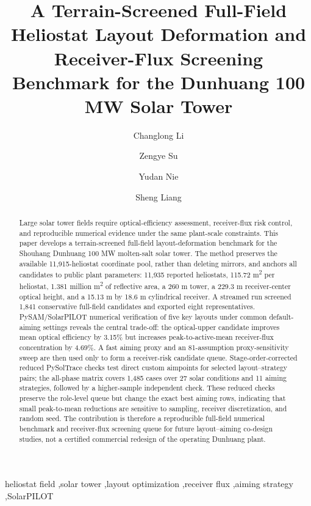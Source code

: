 \documentclass[final,3p,times]{elsarticle}
\begin{document}
\begin{frontmatter}

\title{A Terrain-Screened Full-Field Heliostat Layout Deformation and Receiver-Flux Screening Benchmark for the Dunhuang 100 MW Solar Tower}

\author[aff1]{Changlong Li}
\author[aff1]{Zengye Su}
\author[aff1]{Yudan Nie}
\author[aff1]{Sheng Liang}
\address[aff1]{Guangzhou College of Commerce, Guangzhou, China}

\begin{abstract}
Large solar tower fields require optical-efficiency assessment, receiver-flux risk control, and reproducible numerical evidence under the same plant-scale constraints. This paper develops a terrain-screened full-field layout-deformation benchmark for the Shouhang Dunhuang 100 MW molten-salt solar tower. The method preserves the available 11,915-heliostat coordinate pool, rather than deleting mirrors, and anchors all candidates to public plant parameters: 11,935 reported heliostats, 115.72 m\textsuperscript{2} per heliostat, 1.381 million m\textsuperscript{2} of reflective area, a 260 m tower, a 229.3 m receiver-center optical height, and a 15.13 m by 18.6 m cylindrical receiver. A streamed run screened 1,841 conservative full-field candidates and exported eight representatives. PySAM/SolarPILOT numerical verification of five key layouts under common default-aiming settings reveals the central trade-off: the optical-upper candidate improves mean optical efficiency by 3.15\% but increases peak-to-active-mean receiver-flux concentration by 4.69\%. A fast aiming proxy and an 81-assumption proxy-sensitivity sweep are then used only to form a receiver-risk candidate queue. Stage-order-corrected reduced PySolTrace checks test direct custom aimpoints for selected layout--strategy pairs; the all-phase matrix covers 1,485 cases over 27 solar conditions and 11 aiming strategies, followed by a higher-sample independent check. These reduced checks preserve the role-level queue but change the exact best aiming rows, indicating that small peak-to-mean reductions are sensitive to sampling, receiver discretization, and random seed. The contribution is therefore a reproducible full-field numerical benchmark and receiver-flux screening queue for future layout--aiming co-design studies, not a certified commercial redesign of the operating Dunhuang plant.
\end{abstract}

\begin{keyword}
heliostat field \sep solar tower \sep layout optimization \sep receiver flux \sep aiming strategy \sep SolarPILOT
\end{keyword}

\end{frontmatter}
\end{document}
